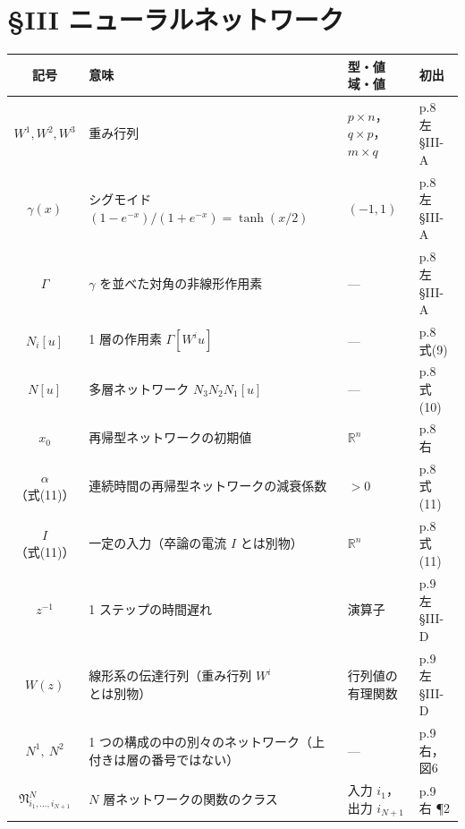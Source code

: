 \documentclass[a4paper,10pt]{ltjsarticle}
\newcommand{\note}[1]{\textcolor{red!70!black}{#1}}
\newenvironment{symtab}{%
  \par\noindent\begin{tabular}{SMTP}
  \toprule
  記号 & 意味 & 型・値域・値 & 初出 \\
  \midrule
}{\bottomrule\end{tabular}\par\medskip}
\begin{document}
\section{§III ニューラルネットワーク}
\begin{symtab}
$W^1,W^2,W^3$ & 重み行列 & $p\times n$，$q\times p$，$m\times q$ & p.8 左 §III-A \\
$\gamma(x)$ & シグモイド $(1-e^{-x})/(1+e^{-x})=\tanh(x/2)$ & $(-1,1)$ & p.8 左 §III-A \\
$\Gamma$ & $\gamma$ を並べた対角の非線形作用素 & --- & p.8 左 §III-A \\
$N_i[u]$ & 1 層の作用素 $\Gamma[W^i u]$ & --- & p.8 式(9) \\
$N[u]$ & 多層ネットワーク $N_3N_2N_1[u]$ & --- & p.8 式(10) \\
$x_0$ & 再帰型ネットワークの初期値 & $\mathbb{R}^n$ & p.8 右 \\
$\alpha$（式(11)） & 連続時間の再帰型ネットワークの減衰係数 & $>0$ & p.8 式(11) \\
$I$（式(11)） & 一定の入力\note{（卒論の電流 $I$ とは別物）} & $\mathbb{R}^n$ & p.8 式(11) \\
$z^{-1}$ & 1 ステップの時間遅れ & 演算子 & p.9 左 §III-D \\
$W(z)$ & 線形系の伝達行列\note{（重み行列 $W^i$ とは別物）} & 行列値の有理関数 & p.9 左 §III-D \\
$N^1,\ N^2$ & 1 つの構成の中の別々のネットワーク\note{（上付きは層の番号ではない）} & --- & p.9 右，図6 \\
$\mathfrak{N}^N_{i_1,\dots,i_{N+1}}$ & $N$ 層ネットワークの関数のクラス & 入力 $i_1$，出力 $i_{N+1}$ & p.9 右 ¶2 \\
\end{symtab}

\end{document}
